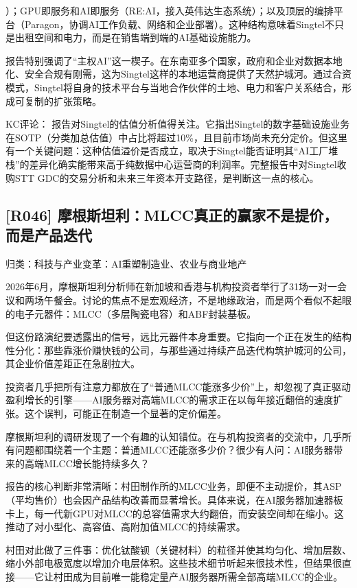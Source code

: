 \documentclass[11pt]{ctexart}
\begin{document}
）；GPU即服务和AI即服务（RE:AI，接入英伟达生态系统）；以及顶层的编排平台（Paragon，协调AI工作负载、网络和企业部署）。这种结构意味着Singtel不只是出租空间和电力，而是在销售端到端的AI基础设施能力。

报告特别强调了“主权AI”这一楔子。在东南亚多个国家，政府和企业对数据本地化、安全合规有刚需，这为Singtel这样的本地运营商提供了天然护城河。通过合资模式，Singtel将自身的技术平台与当地合作伙伴的土地、电力和客户关系结合，形成可复制的扩张策略。

KC评论： 报告对Singtel的估值分析值得关注。它指出Singtel的数字基础设施业务在SOTP（分类加总估值）中占比将超过10\%，且目前市场尚未充分定价。但这里有一个关键问题：这种估值溢价是否成立，取决于Singtel能否证明其“AI工厂堆栈”的差异化确实能带来高于纯数据中心运营商的利润率。完整报告中对Singtel收购STT GDC的交易分析和未来三年资本开支路径，是判断这一点的核心。

\subsection{[R046] 摩根斯坦利：MLCC真正的赢家不是提价，而是产品迭代}
{\small\color{refgray}归类：科技与产业变革：AI重塑制造业、农业与商业地产}

2026年6月，摩根斯坦利分析师在新加坡和香港与机构投资者举行了31场一对一会议和两场午餐会。讨论的焦点不是宏观经济，不是地缘政治，而是两个看似不起眼的电子元器件：MLCC（多层陶瓷电容）和ABF封装基板。

但这份路演纪要透露出的信号，远比元器件本身重要。它指向一个正在发生的结构性分化：那些靠涨价赚快钱的公司，与那些通过持续产品迭代构筑护城河的公司，其企业价值差距正在急剧拉大。

投资者几乎把所有注意力都放在了“普通MLCC能涨多少价”上，却忽视了真正驱动盈利增长的引擎——AI服务器对高端MLCC的需求正在以每年接近翻倍的速度扩张。这个误判，可能正在制造一个显著的定价偏差。

摩根斯坦利的调研发现了一个有趣的认知错位。在与机构投资者的交流中，几乎所有问题都围绕着一个主题：普通MLCC还能涨多少价？很少有人问：AI服务器带来的高端MLCC增长能持续多久？

报告的核心判断非常清晰：村田制作所的MLCC业务，即便不主动提价，其ASP（平均售价）也会因产品结构改善而显著增长。具体来说，在AI服务器加速器板卡上，每一代新GPU对MLCC的总容值需求大约翻倍，而安装空间却在缩小。这推动了对小型化、高容值、高附加值MLCC的持续需求。

村田对此做了三件事：优化钛酸钡（关键材料）的粒径并使其均匀化、增加层数、缩小外部电极宽度以增加介电层体积。这些技术细节听起来很技术性，但结果很直接——它让村田成为目前唯一能稳定量产AI服务器所需全部高端MLCC的企业。
\end{document}
